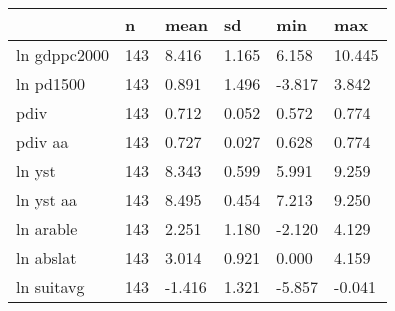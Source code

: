 \begin{table}[htbp]
\begin{tabular}{|l|l|l|l|l|l|}\hline  
 & n  & mean  & sd  & min  & max  \\ \hline  
ln gdppc2000 &       143 &     8.416 &     1.165 &     6.158 &    10.445 \\ \hline 
ln pd1500 &       143 &     0.891 &     1.496 &    -3.817 &     3.842 \\ \hline 
pdiv &       143 &     0.712 &     0.052 &     0.572 &     0.774 \\ \hline 
pdiv aa &       143 &     0.727 &     0.027 &     0.628 &     0.774 \\ \hline 
ln yst &       143 &     8.343 &     0.599 &     5.991 &     9.259 \\ \hline 
ln yst aa &       143 &     8.495 &     0.454 &     7.213 &     9.250 \\ \hline 
ln arable &       143 &     2.251 &     1.180 &    -2.120 &     4.129 \\ \hline 
ln abslat &       143 &     3.014 &     0.921 &     0.000 &     4.159 \\ \hline 
ln suitavg &       143 &    -1.416 &     1.321 &    -5.857 &    -0.041 \\ \hline 
  \end{tabular}
\end{table}
